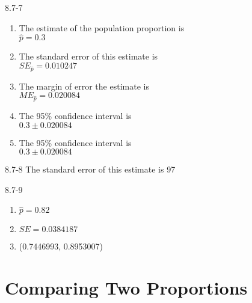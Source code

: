 \begin{exsol@solution}{8.7-7}
\begin{enumerate}
\item	The estimate of the population proportion is \\ $\hat{p} = 0.3$
\item	The standard error of this estimate is \\ $SE_{\hat{p}} = 0.010247$
\item The margin of error the estimate is \\ $ME_{\hat{p}} = 0.020084$
\item	The 95\% confidence interval is \\ $0.3 \pm 0.020084$
\item	The 95\% confidence interval is \\ $0.3 \pm 0.020084$
\end{enumerate}
\end{exsol@solution}
\begin{exsol@solution}{8.7-8}
The standard error of this estimate is 97

\end{exsol@solution}
\begin{exsol@solution}{8.7-9}
\begin{enumerate}
\item $\hat{p} = 0.82$
\item $SE = 0.0384187$
\item (0.7446993, 0.8953007)
\end{enumerate}

\end{exsol@solution}
\setcounter{chapter}{8}\chapter{Comparing Two Proportions }
